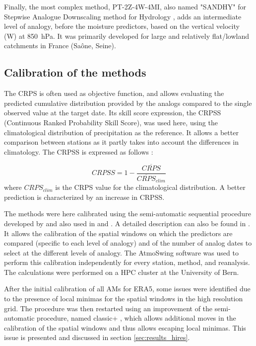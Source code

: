 \documentclass[alpha-refs]{wiley-article}
\begin{document}
Finally, the most complex method, PT-2Z-4W-4MI, also named "SANDHY" for Stepwise Analogue Downscaling method for Hydrology \citep{BenDaoud2016, Caillouet2016}, adds an intermediate level of analogy, before the moisture predictors, based on the vertical velocity (W) at 850~hPa. It was primarily developed for large and relatively flat/lowland catchments in France (Sa\^{o}ne, Seine).


\subsection{Calibration of the methods}
\label{sec:calibration}

The CRPS \citep[Continuous Ranked Probability Score,][]{Brown1974, Matheson1976, Hersbach2000} is often used as objective function, and allows evaluating the predicted cumulative distribution provided by the analogs compared to the single observed value at the target date. Its skill score expression, the CRPSS (Continuous Ranked Probability Skill Score), was used here, using the climatological distribution of precipitation as the reference. It allows a better comparison between stations as it partly takes into account the differences in climatology. The CRPSS is expressed as follows \citep{Bradley2011}:

\begin{equation}
	\label{eq:CRPSS}
	CRPSS = 1-\frac{\overline{CRPS}}{\overline{CRPS}_{clim}}
\end{equation}
where $CRPS_{clim}$ is the CRPS value for the climatological distribution. A better prediction is characterized by an increase in CRPSS.

The methods were here calibrated using the semi-automatic sequential procedure developed by \citet{Bontron2004} and also used in \citet{Radanovics2013} and \citet{BenDaoud2016}. A detailed description can also be found in \citet{Horton2019}. It allows the calibration of the spatial windows on which the predictors are compared (specific to each level of analogy) and of the number of analog dates to select at the different levels of analogy. The AtmoSwing software \citep{Horton2019} was used to perform this calibration independently for every station, method, and reanalysis. The calculations were performed on a HPC cluster at the University of Bern. 

After the initial calibration of all AMs for ERA5, some issues were identified due to the presence of local minimas for the spatial windows in the high resolution grid. The procedure was then restarted using an improvement of the semi-automatic procedure, named classic+ \citep{Horton2019}, which allows additional moves in the calibration of the spatial windows and thus allows escaping local minimas. This issue is presented and discussed in section \ref{sec:results_hires}.
\end{document}
